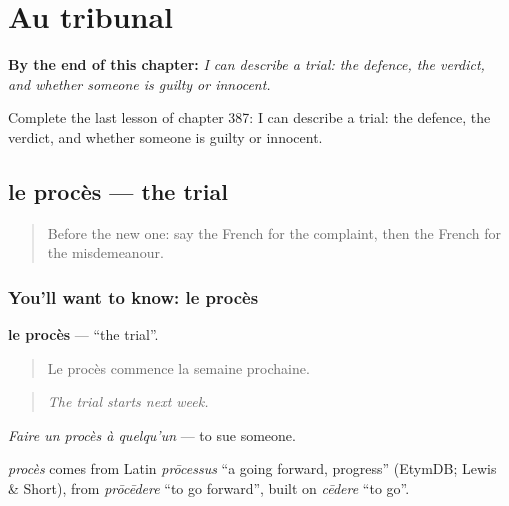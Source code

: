 
\chapter{Au tribunal}
\label{ch:fr-au-tribunal}

\begin{chapteropening}
\textbf{By the end of this chapter:} \emph{I can describe a trial: the defence, the verdict, and whether someone is guilty or innocent.}

Complete the last lesson of chapter 387: I can describe a trial: the defence, the verdict, and whether someone is guilty or innocent.
\end{chapteropening}

\section[le procès]{le procès — the trial}

\label{lesson:FR-C387-proces}



\begin{quote}
Before the new one: say the French for the complaint, then the French for the misdemeanour.
\end{quote}

\subsection*{You'll want to know: le procès}
\textbf{le procès} — \textquotedblleft{}the trial\textquotedblright{}.

\begin{quote}
Le procès commence la semaine prochaine.
\end{quote}

\begin{quote}
\emph{The trial starts next week.}
\end{quote}

\emph{Faire un procès à quelqu'un} — to sue someone.

\begin{cousinweb}
\emph{procès} comes from Latin \emph{prōcessus} \textquotedblleft{}a going forward, progress\textquotedblright{} (EtymDB; Lewis \& Short), from \emph{prōcēdere} \textquotedblleft{}to go forward\textquotedblright{}, built on \emph{cēdere} \textquotedblleft{}to go\textquotedblright{}.
\end{cousinweb}

